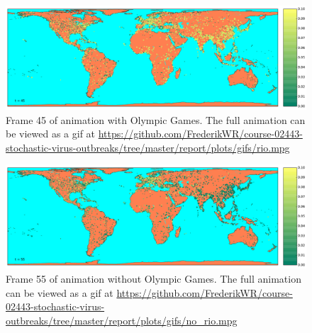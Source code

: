 \begin{figure}[H]
	\centering
	\includegraphics[width=1.0 \linewidth]{plots/gifs/frames/rio-45}
	\caption{Frame 45 of animation with Olympic Games. The full animation can be viewed as a gif at
		\url{https://github.com/FrederikWR/course-02443-stochastic-virus-outbreaks/tree/master/report/plots/gifs/rio.mpg}}
\end{figure}

\begin{figure}[H]
	\centering
	\includegraphics[width=1.0 \linewidth]{plots/gifs/frames/noRio-55}
	\caption{Frame 55 of animation without Olympic Games. The full animation can be viewed as a gif at
		\url{https://github.com/FrederikWR/course-02443-stochastic-virus-outbreaks/tree/master/report/plots/gifs/no\_rio.mpg}}
\end{figure}


